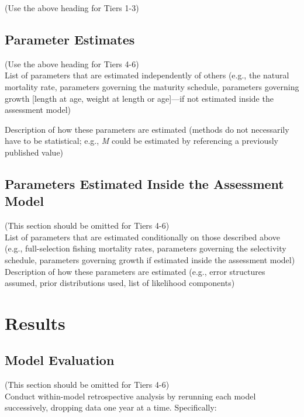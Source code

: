 \documentclass[
  11pt,
]{article}
\begin{document}
(Use the above heading for Tiers 1-3)

\hypertarget{parameter-estimates}{%
\subsection{Parameter Estimates}\label{parameter-estimates}}

(Use the above heading for Tiers 4-6)\\
List of parameters that are estimated independently of others (e.g., the natural mortality rate, parameters governing the maturity schedule, parameters governing growth {[}length at age, weight at length or age{]}---if not estimated inside the assessment model)

Description of how these parameters are estimated (methods do not necessarily have to be statistical; e.g., \emph{M} could be estimated by referencing a previously published value)

\hypertarget{parameters-estimated-inside-the-assessment-model}{%
\subsection{Parameters Estimated Inside the Assessment Model}\label{parameters-estimated-inside-the-assessment-model}}

(This section should be omitted for Tiers 4-6)\\
List of parameters that are estimated conditionally on those described above (e.g., full-selection fishing mortality rates, parameters governing the selectivity schedule, parameters governing growth if estimated inside the assessment model)
Description of how these parameters are estimated (e.g., error structures assumed, prior distributions used, list of likelihood components)

\hypertarget{results}{%
\section{Results}\label{results}}

\hypertarget{model-evaluation}{%
\subsection{Model Evaluation}\label{model-evaluation}}

(This section should be omitted for Tiers 4-6)\\
Conduct within-model retrospective analysis by rerunning each model successively, dropping data one year at a time.
Specifically:
\end{document}

